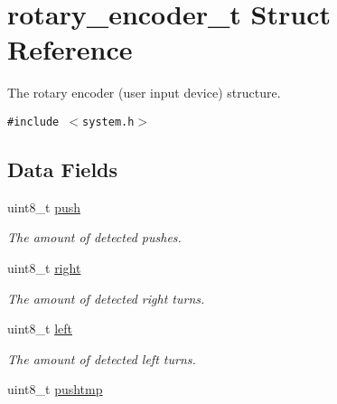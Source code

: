 \hypertarget{structrotary__encoder__t}{
\section{rotary\_\-encoder\_\-t Struct Reference}
\label{structrotary__encoder__t}
}
The rotary encoder (user input device) structure.  


{\tt \#include $<$system.h$>$}

\subsection*{Data Fields}
\begin{CompactItemize}
\item 
\hypertarget{structrotary__encoder__t_4c3ef6e33c8b1a62cc0fd62885692e46}{
uint8\_\-t \hyperlink{structrotary__encoder__t_4c3ef6e33c8b1a62cc0fd62885692e46}{push}}
\label{structrotary__encoder__t_4c3ef6e33c8b1a62cc0fd62885692e46}

\begin{CompactList}\small\item\em The amount of detected pushes. \item\end{CompactList}\item 
\hypertarget{structrotary__encoder__t_bf888e3b4cc08d5ced47c59224d6aa57}{
uint8\_\-t \hyperlink{structrotary__encoder__t_bf888e3b4cc08d5ced47c59224d6aa57}{right}}
\label{structrotary__encoder__t_bf888e3b4cc08d5ced47c59224d6aa57}

\begin{CompactList}\small\item\em The amount of detected right turns. \item\end{CompactList}\item 
\hypertarget{structrotary__encoder__t_264955f38189fb291a5698e99acf55df}{
uint8\_\-t \hyperlink{structrotary__encoder__t_264955f38189fb291a5698e99acf55df}{left}}
\label{structrotary__encoder__t_264955f38189fb291a5698e99acf55df}

\begin{CompactList}\small\item\em The amount of detected left turns. \item\end{CompactList}\item 
\hypertarget{structrotary__encoder__t_ff884925a4a9652bc168b11cdf83d50a}{
uint8\_\-t \hyperlink{structrotary__encoder__t_ff884925a4a9652bc168b11cdf83d50a}{pushtmp}}
\label{structrotary__encoder__t_ff884925a4a9652bc168b11cdf83d50a}


\end{CompactItemize}
